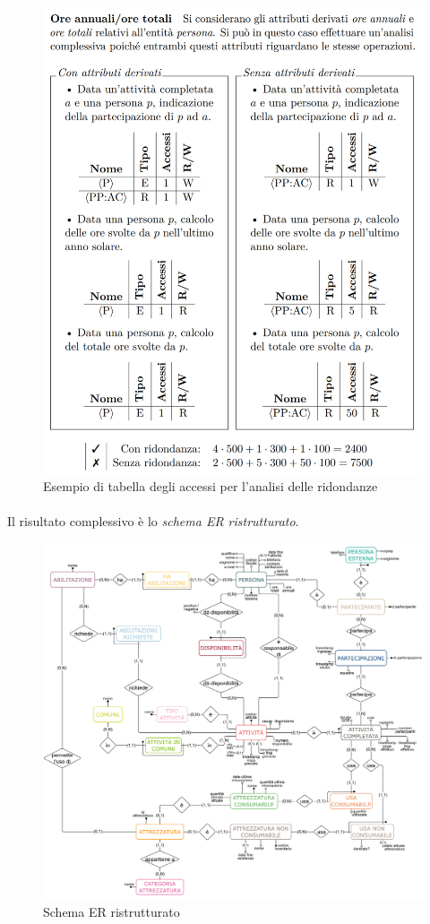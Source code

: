 \documentclass[12pt,a4paper,twoside,english,italian]{book}
\begin{document}
\begin{figure}[H]
    \centering
    \includegraphics[width=.65\textwidth]{img/tabella_accessi.png}
    \caption{Esempio di tabella degli accessi per l'analisi delle ridondanze}
\end{figure}


\newpage

\paragraph{} Il risultato complessivo è lo \emph{schema ER ristrutturato}.

\begin{figure}[H]
    \centering
    \includegraphics[width=1\textwidth]{img/er-ristrutturato.png}
    \caption{Schema ER ristrutturato}
\end{figure}
\end{document}
